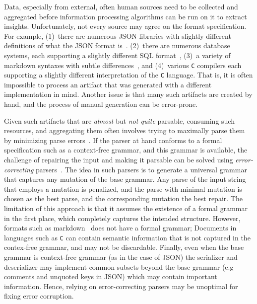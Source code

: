 \documentclass[sigconf,review,anonymous]{acmart}
\def\<#1>{\texttt{#1}}
\begin{document}
Data, especially from external, often human sources need to be collected and
aggregated before information processing algorithms can be run on it to extract
insights. Unfortunately, not every source may agree on the format specification.
For example, (1)~there are numerous JSON libraries with slightly different
definitions of what the JSON format is~\cite{harrand2021behavioral,seriot2016parsing}.
(2)~there are numerous database systems, each supporting a slightly
different SQL format~\cite{arvin2018comparison}, (3)~a variety of markdown
syntaxes with subtle differences~\cite{visnoviz2019comparison}, and (4)~various
\<C> compilers each supporting a slightly different interpretation of the \<C> language.
That is, it is often impossible to process an artifact that was generated with
a different implementation in mind. Another issue is that many such artifacts
are created by hand, and the process of manual generation can be error-prone.

Given such artifacts that are \emph{almost} but \emph{not quite} parsable,
consuming such resources, and aggregating them often involves trying to
maximally parse them by minimizing parse errors~\cite{kirschner2020debugging}.
If the parser at hand conforms to a formal specification such as a context-free
grammar, and this grammar is available,
the challenge of repairing the input and making it parsable can be solved using
\emph{error-correcting} parsers~\cite{aho1972minimum,diekmann2020dont}.
The idea in such parsers is to generate a universal grammar that captures
any mutation of the base grammar. Any parse of the input string that employs a
mutation is penalized, and the parse with minimal mutation is chosen as the
best parse, and the corresponding mutation the best repair. The limitation of
this approach is that it assumes the existence of a formal grammar in the first
place, which completely captures the intended structure.
However, formats such as markdown~\cite{gruber2004markdown} does not have
a formal grammar; Documents in languages such as \<C> can contain semantic
information that is not captured in the contex-free grammar, and may not be
discardable. Finally, even when the base grammar is context-free grammar (as in
the case of JSON) the serializer and deserializer may implement common subsets
beyond the base grammar (e.g comments and unquoted keys in JSON) which may
contain important information. Hence, relying on error-correcting parsers may
be unoptimal for fixing error corruption.
\end{document}
